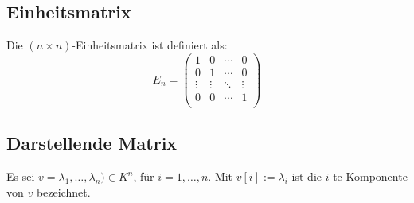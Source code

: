 \subsection{Einheitsmatrix}
Die $(n \times n)$-Einheitsmatrix ist definiert als:
\begin{equation*}
E_n=\begin{pmatrix}
1 & 0 & \cdots & 0\\
0 & 1 & \cdots & 0\\
\vdots & \vdots & \ddots & \vdots\\
0 & 0 & \cdots & 1\\
\end{pmatrix}
\end{equation*}
\subsection{Darstellende Matrix}
Es sei $v = \lambda_1, \dots, \lambda_n) \in K^n$, für $i=1,\dots,n$. Mit $v[i] := \lambda_i$ ist die $i$-te Komponente von $v$ bezeichnet.
